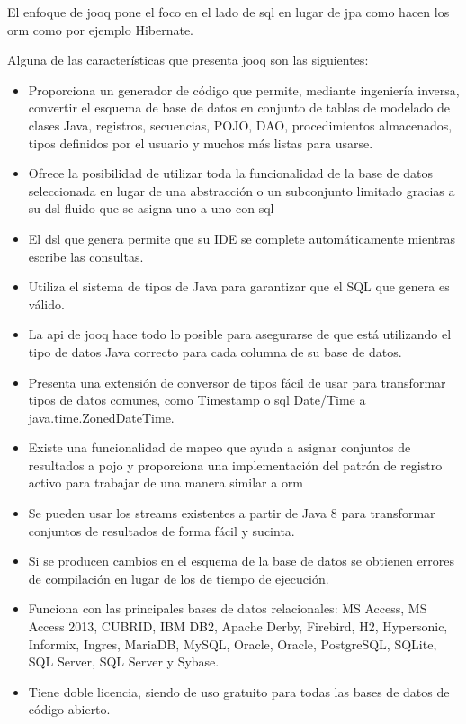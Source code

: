 El enfoque de \acrshort{jooq} pone el foco en el lado de \acrfull{sql} en lugar de \acrshort{jpa} como hacen los \acrfull{orm} como por ejemplo Hibernate.

Alguna de las características que presenta \acrshort{jooq} son las siguientes\citep{VentajasJooq}:
\begin{itemize}
\item Proporciona un generador de código que permite, mediante ingeniería inversa, convertir el esquema de base de datos en conjunto de tablas de modelado de clases Java, registros, secuencias, POJO, DAO, procedimientos almacenados, tipos definidos por el usuario y muchos más listas para usarse. 
\item Ofrece la posibilidad de utilizar toda la funcionalidad de la base de datos seleccionada en lugar de una abstracción o un subconjunto limitado gracias a su \acrfull{dsl} fluido que se asigna uno a uno con \acrshort{sql}
\item El \acrfull{dsl} que genera permite que su IDE se complete automáticamente mientras escribe las consultas.
\item Utiliza el sistema de tipos de Java para garantizar que el SQL que genera es válido.
\item La \acrshort{api} de \acrshort{jooq} hace todo lo posible para asegurarse de que está utilizando el tipo de datos Java correcto para cada columna de su base de datos. 
\item Presenta una extensión de conversor de tipos fácil de usar para transformar tipos de datos comunes, como Timestamp o \acrshort{sql} Date/Time a java.time.ZonedDateTime.
\item Existe una funcionalidad de mapeo que ayuda a asignar conjuntos de resultados a \acrfull{pojo} y proporciona una implementación del patrón de registro activo para trabajar de una manera similar a \acrshort{orm}
\item Se pueden usar los streams existentes a partir de Java 8 para transformar conjuntos de resultados de forma fácil y sucinta.
\item Si se producen cambios en el esquema de la base de datos se obtienen errores de compilación en lugar de los de tiempo de ejecución.
\item Funciona con las principales bases de datos relacionales: MS Access, MS Access 2013, CUBRID, IBM DB2, Apache Derby, Firebird, H2, Hypersonic, Informix, Ingres, MariaDB, MySQL, Oracle, Oracle, PostgreSQL, SQLite, SQL Server, SQL Server y Sybase.
\item Tiene doble licencia, siendo de uso gratuito para todas las bases de datos de código abierto.
\end{itemize}

